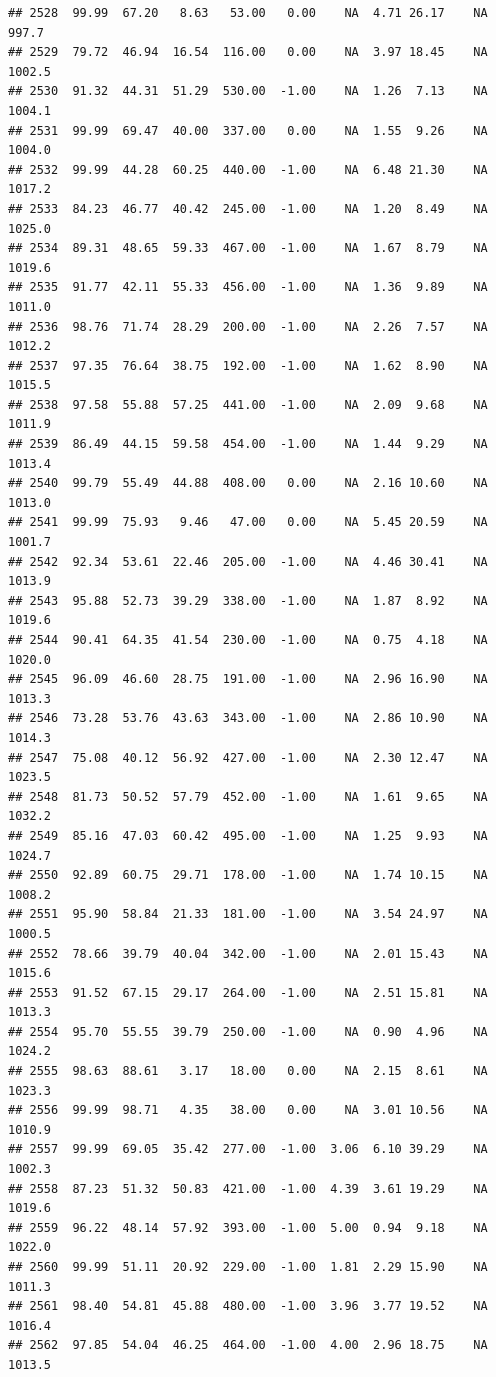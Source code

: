\documentclass{article}\usepackage{graphicx, color}
\makeatletter
\newenvironment{kframe}{%
 \def\at@end@of@kframe{}%
 \ifinner\ifhmode%
  \def\at@end@of@kframe{\end{minipage}}%
  \begin{minipage}{\columnwidth}%
 \fi\fi%
 \def\FrameCommand##1{\hskip\@totalleftmargin \hskip-\fboxsep
 \colorbox{shadecolor}{##1}\hskip-\fboxsep
     \hskip-\linewidth \hskip-\@totalleftmargin \hskip\columnwidth}%
 \MakeFramed {\advance\hsize-\width
   \@totalleftmargin\z@ \linewidth\hsize
   \@setminipage}}%
 {\par\unskip\endMakeFramed%
 \at@end@of@kframe}
\newenvironment{knitrout}{}{} %
\makeatother
\begin{document}
\begin{knitrout}
\begin{kframe}
\begin{verbatim}
## 2528  99.99  67.20   8.63   53.00   0.00    NA  4.71 26.17    NA  997.7
## 2529  79.72  46.94  16.54  116.00   0.00    NA  3.97 18.45    NA 1002.5
## 2530  91.32  44.31  51.29  530.00  -1.00    NA  1.26  7.13    NA 1004.1
## 2531  99.99  69.47  40.00  337.00   0.00    NA  1.55  9.26    NA 1004.0
## 2532  99.99  44.28  60.25  440.00  -1.00    NA  6.48 21.30    NA 1017.2
## 2533  84.23  46.77  40.42  245.00  -1.00    NA  1.20  8.49    NA 1025.0
## 2534  89.31  48.65  59.33  467.00  -1.00    NA  1.67  8.79    NA 1019.6
## 2535  91.77  42.11  55.33  456.00  -1.00    NA  1.36  9.89    NA 1011.0
## 2536  98.76  71.74  28.29  200.00  -1.00    NA  2.26  7.57    NA 1012.2
## 2537  97.35  76.64  38.75  192.00  -1.00    NA  1.62  8.90    NA 1015.5
## 2538  97.58  55.88  57.25  441.00  -1.00    NA  2.09  9.68    NA 1011.9
## 2539  86.49  44.15  59.58  454.00  -1.00    NA  1.44  9.29    NA 1013.4
## 2540  99.79  55.49  44.88  408.00   0.00    NA  2.16 10.60    NA 1013.0
## 2541  99.99  75.93   9.46   47.00   0.00    NA  5.45 20.59    NA 1001.7
## 2542  92.34  53.61  22.46  205.00  -1.00    NA  4.46 30.41    NA 1013.9
## 2543  95.88  52.73  39.29  338.00  -1.00    NA  1.87  8.92    NA 1019.6
## 2544  90.41  64.35  41.54  230.00  -1.00    NA  0.75  4.18    NA 1020.0
## 2545  96.09  46.60  28.75  191.00  -1.00    NA  2.96 16.90    NA 1013.3
## 2546  73.28  53.76  43.63  343.00  -1.00    NA  2.86 10.90    NA 1014.3
## 2547  75.08  40.12  56.92  427.00  -1.00    NA  2.30 12.47    NA 1023.5
## 2548  81.73  50.52  57.79  452.00  -1.00    NA  1.61  9.65    NA 1032.2
## 2549  85.16  47.03  60.42  495.00  -1.00    NA  1.25  9.93    NA 1024.7
## 2550  92.89  60.75  29.71  178.00  -1.00    NA  1.74 10.15    NA 1008.2
## 2551  95.90  58.84  21.33  181.00  -1.00    NA  3.54 24.97    NA 1000.5
## 2552  78.66  39.79  40.04  342.00  -1.00    NA  2.01 15.43    NA 1015.6
## 2553  91.52  67.15  29.17  264.00  -1.00    NA  2.51 15.81    NA 1013.3
## 2554  95.70  55.55  39.79  250.00  -1.00    NA  0.90  4.96    NA 1024.2
## 2555  98.63  88.61   3.17   18.00   0.00    NA  2.15  8.61    NA 1023.3
## 2556  99.99  98.71   4.35   38.00   0.00    NA  3.01 10.56    NA 1010.9
## 2557  99.99  69.05  35.42  277.00  -1.00  3.06  6.10 39.29    NA 1002.3
## 2558  87.23  51.32  50.83  421.00  -1.00  4.39  3.61 19.29    NA 1019.6
## 2559  96.22  48.14  57.92  393.00  -1.00  5.00  0.94  9.18    NA 1022.0
## 2560  99.99  51.11  20.92  229.00  -1.00  1.81  2.29 15.90    NA 1011.3
## 2561  98.40  54.81  45.88  480.00  -1.00  3.96  3.77 19.52    NA 1016.4
## 2562  97.85  54.04  46.25  464.00  -1.00  4.00  2.96 18.75    NA 1013.5

\end{verbatim}
\end{kframe}
\end{knitrout}
\end{document}
